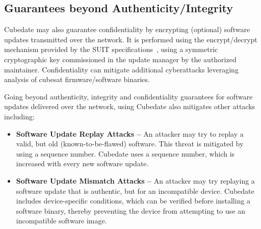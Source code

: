 \subsection{Guarantees beyond Authenticity/Integrity}

Cubedate may also guarantee confidentiality by encrypting (optional) software updates transmitted over the network.
It is performed using the encrypt/decrypt mechanism provided by the SUIT specifications~\cite{suit-firmware-encryption}, using a symmetric cryptographic key commissioned in the update manager by the authorized maintainer. 
Confidentiality can mitigate additional cyberattacks leveraging analysis of cubesat firmware/software binaries.

Going beyond authenticity, integrity and confidentiality guarantees for software updates delivered over the network, using Cubedate also mitigates other attacks including:
\begin{itemize}
\item {\bf Software Update Replay Attacks –} An attacker may try to replay a valid, but old (known-to-be-flawed) software. This threat is mitigated by using a sequence number. Cubedate uses a sequence number, which is increased with every new software update.

\item {\bf Software Update Mismatch Attacks –} An attacker may try replaying a software update that is authentic, but for an incompatible device. Cubedate includes device-specific conditions, which can be verified before installing a software binary, thereby preventing the device from attempting to use an incompatible software image.
\end{itemize}

